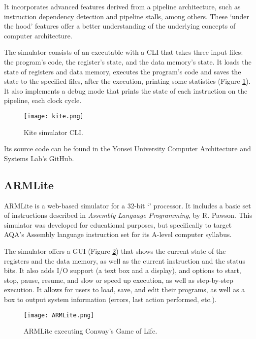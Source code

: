 It incorporates advanced features derived from a \gls{pipeline} architecture, such as \gls{instruction dependency} detection and \gls{pipeline stalls}, among others. These `under the hood' features offer a better understanding of the underlying concepts of computer architecture.

The simulator consists of an executable with a \gls{CLI} that takes three input files: the program's code, the register's state, and the data \gls{memory}'s state. It loads the state of registers and data \gls{memory}, executes the program's code and saves the state to the specified files, after the execution, printing some statistics (Figure \ref{fig:kite}). It also implements a \gls{debug} mode that prints the state of each instruction on the \gls{pipeline}, each \gls{clock cycle}.

\begin{figure}[h]
  \caption{Kite simulator \gls{CLI}.}
  \texttt{[image: kite.png]}
  \label{fig:kite}
\end{figure}

Its source code can be found in the Yonsei University Computer Architecture and Systems Lab's GitHub\supercite{kiteGH}.


\subsection*{ARMLite}\label{subsubsec:armlite}
ARMLite\supercite{ARMLite} is a web-based simulator for a 32-bit `' processor. It includes a basic set of instructions described in \textit{Assembly Language Programming}\supercite{PawsonRichard.2020Ass}, by R. Pawson. This simulator was developed for educational purposes, but specifically to target AQA\supercite{AQA}'s Assembly language instruction set for its A-level computer syllabus\supercite{AQAInstructionSet}.

The simulator offers a \gls{GUI} (Figure \ref{fig:armlite}) that shows the current state of the \glspl{register} and the data \gls{memory}, as well as the current instruction and the status bits. It also adds \gls{I/O} support (a text box and a display), and options to start, stop, pause, resume, and slow or speed up execution, as well as step-by-step execution. It allows for users to load, save, and edit their programs, as well as a box to output system information (errors, last action performed, etc.).

\begin{figure}[h]
  \caption{ARMLite executing Conway's Game of Life\normalfont\supercite{Gardner1970fantastic}.}
  \texttt{[image: ARMLite.png]}
  \label{fig:armlite}
\end{figure}

